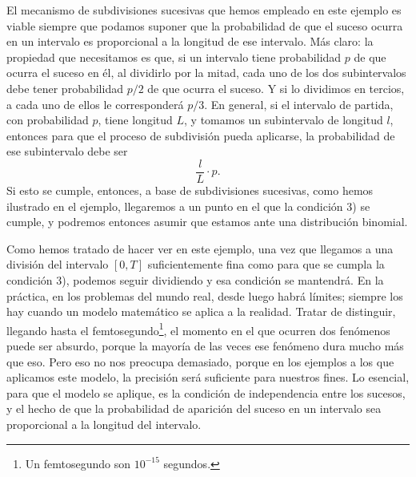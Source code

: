 El mecanismo de subdivisiones sucesivas que hemos empleado en este ejemplo es viable siempre que
podamos suponer que la probabilidad de que el suceso ocurra en un intervalo es proporcional a la
longitud de ese intervalo. Más claro: la propiedad que necesitamos es que, si un intervalo tiene
probabilidad $p$ de que ocurra el suceso en él, al dividirlo por la mitad, cada uno de los dos
subintervalos debe tener probabilidad $p/2$ de que ocurra el suceso. Y si lo dividimos en tercios,
a cada uno de ellos le corresponderá $p/3$. En general, si el intervalo de partida, con
probabilidad $p$, tiene longitud $L$, y tomamos un subintervalo de longitud $l$, entonces para que
el proceso de subdivisión pueda aplicarse, la probabilidad de ese subintervalo debe ser
\[\dfrac{l}{L}\cdot p.\]
Si esto se cumple, entonces, a base de subdivisiones sucesivas, como hemos ilustrado en el ejemplo,
llegaremos a un punto en el que la condición 3) se cumple, y podremos entonces asumir que estamos
ante una distribución binomial.


Como hemos tratado de hacer ver en este ejemplo, una vez que llegamos a una división del intervalo
$[0,T]$ suficientemente fina como para que se cumpla la condición 3), podemos seguir dividiendo y
esa condición se mantendrá. En la práctica, en los problemas del mundo real, desde luego habrá
límites; siempre los hay cuando un modelo matemático se aplica a la realidad. Tratar de distinguir,
llegando hasta el femtosegundo\footnote{Un femtosegundo son $10^{-15}$ segundos.}, el momento en el
que ocurren dos fenómenos puede ser absurdo, porque la mayoría de las veces ese fenómeno dura mucho
más que eso. Pero eso no nos preocupa demasiado, porque en los ejemplos a los que aplicamos este
modelo, la precisión será suficiente para nuestros fines. Lo esencial, para que el modelo se
aplique, es la condición de independencia entre los sucesos, y el hecho de que la probabilidad de
aparición del suceso en un intervalo sea proporcional a la longitud del intervalo.

